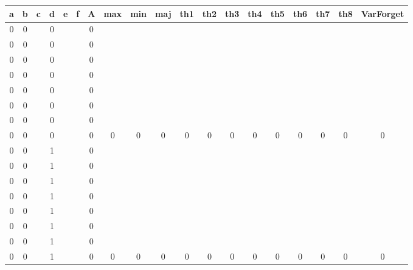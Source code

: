 \begin{table}[!tb]
    \centering
    \begin{tabular}{|c|c|c|c|c|c|c|c|c|c|c|c|c|c|c|c|c|c|c|}
        \hline
        \textbf{a} & \textbf{b} & \textbf{c} & \textbf{d} & \textbf{e} & \textbf{f} & \textbf{A} & \textbf{max} & \textbf{min} & \textbf{maj} & \textbf{th1} & \textbf{th2} & \textbf{th3} & \textbf{th4} & \textbf{th5} & \textbf{th6} & \textbf{th7} & \textbf{th8} & \textbf{VarForget} \\ \hline
        \rowcolor{gray!40} 0 & 0 &  & 0 &  &  & 0 &  &  &  &  &  &  &  &  &  &  &  &  \\ \hline
        \rowcolor{gray!40} 0 & 0 &  & 0 &  &  & 0 &  &  &  &  &  &  &  &  &  &  &  &  \\ \hline
        \rowcolor{gray!40} 0 & 0 &  & 0 &  &  & 0 &  &  &  &  &  &  &  &  &  &  &  &  \\ \hline
        \rowcolor{gray!40} 0 & 0 &  & 0 &  &  & 0 &  &  &  &  &  &  &  &  &  &  &  &  \\ \hline
        \rowcolor{gray!40} 0 & 0 &  & 0 &  &  & 0 &  &  &  &  &  &  &  &  &  &  &  &  \\ \hline
        \rowcolor{gray!40} 0 & 0 &  & 0 &  &  & 0 &  &  &  &  &  &  &  &  &  &  &  &  \\ \hline
        \rowcolor{gray!40} 0 & 0 &  & 0 &  &  & 0 &  &  &  &  &  &  &  &  &  &  &  &  \\ \hline
        \rowcolor{gray!40} 0 & 0 &  & 0 &  &  & 0 & 0 & 0 & 0 & 0 & 0 & 0 & 0 & 0 & 0 & 0 & 0 & 0 \\ \hline
        \rowcolor{blue!40} 0 & 0 &  & 1 &  &  & 0 &  &  &  &  &  &  &  &  &  &  &  &  \\ \hline
        \rowcolor{blue!40} 0 & 0 &  & 1 &  &  & 0 &  &  &  &  &  &  &  &  &  &  &  &  \\ \hline
        \rowcolor{blue!40} 0 & 0 &  & 1 &  &  & 0 &  &  &  &  &  &  &  &  &  &  &  &  \\ \hline
        \rowcolor{blue!40} 0 & 0 &  & 1 &  &  & 0 &  &  &  &  &  &  &  &  &  &  &  &  \\ \hline
        \rowcolor{blue!40} 0 & 0 &  & 1 &  &  & 0 &  &  &  &  &  &  &  &  &  &  &  &  \\ \hline
        \rowcolor{blue!40} 0 & 0 &  & 1 &  &  & 0 &  &  &  &  &  &  &  &  &  &  &  &  \\ \hline
        \rowcolor{blue!40} 0 & 0 &  & 1 &  &  & 0 &  &  &  &  &  &  &  &  &  &  &  &  \\ \hline
        \rowcolor{blue!40} 0 & 0 &  & 1 &  &  & 0 & 0 & 0 & 0 & 0 & 0 & 0 & 0 & 0 & 0 & 0 & 0 & 0 \\ \hline

\end{tabular}
\end{table}
